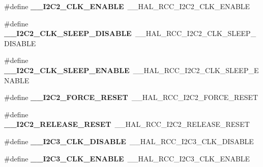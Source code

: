 \begin{DoxyCompactItemize}
\mbox{\label{group___h_a_l___r_c_c___aliased_ga5cef079b7e35da960f9871a7d1ed1816}} 
\#define {\bfseries \+\_\+\+\_\+\+I2\+C2\+\_\+\+C\+L\+K\+\_\+\+E\+N\+A\+B\+LE}~\+\_\+\+\_\+\+H\+A\+L\+\_\+\+R\+C\+C\+\_\+\+I2\+C2\+\_\+\+C\+L\+K\+\_\+\+E\+N\+A\+B\+LE
\item 
\mbox{\label{group___h_a_l___r_c_c___aliased_ga9433bf9082b7128475bf4a4073bcdca1}} 
\#define {\bfseries \+\_\+\+\_\+\+I2\+C2\+\_\+\+C\+L\+K\+\_\+\+S\+L\+E\+E\+P\+\_\+\+D\+I\+S\+A\+B\+LE}~\+\_\+\+\_\+\+H\+A\+L\+\_\+\+R\+C\+C\+\_\+\+I2\+C2\+\_\+\+C\+L\+K\+\_\+\+S\+L\+E\+E\+P\+\_\+\+D\+I\+S\+A\+B\+LE
\item 
\mbox{\label{group___h_a_l___r_c_c___aliased_ga64ad1beac30d497e381d374778b1a953}} 
\#define {\bfseries \+\_\+\+\_\+\+I2\+C2\+\_\+\+C\+L\+K\+\_\+\+S\+L\+E\+E\+P\+\_\+\+E\+N\+A\+B\+LE}~\+\_\+\+\_\+\+H\+A\+L\+\_\+\+R\+C\+C\+\_\+\+I2\+C2\+\_\+\+C\+L\+K\+\_\+\+S\+L\+E\+E\+P\+\_\+\+E\+N\+A\+B\+LE
\item 
\mbox{\label{group___h_a_l___r_c_c___aliased_ga07143f105327507321078f673940461d}} 
\#define {\bfseries \+\_\+\+\_\+\+I2\+C2\+\_\+\+F\+O\+R\+C\+E\+\_\+\+R\+E\+S\+ET}~\+\_\+\+\_\+\+H\+A\+L\+\_\+\+R\+C\+C\+\_\+\+I2\+C2\+\_\+\+F\+O\+R\+C\+E\+\_\+\+R\+E\+S\+ET
\item 
\mbox{\label{group___h_a_l___r_c_c___aliased_gaf7a482f23ba23252ef88c00e86edde9a}} 
\#define {\bfseries \+\_\+\+\_\+\+I2\+C2\+\_\+\+R\+E\+L\+E\+A\+S\+E\+\_\+\+R\+E\+S\+ET}~\+\_\+\+\_\+\+H\+A\+L\+\_\+\+R\+C\+C\+\_\+\+I2\+C2\+\_\+\+R\+E\+L\+E\+A\+S\+E\+\_\+\+R\+E\+S\+ET
\item 
\mbox{\label{group___h_a_l___r_c_c___aliased_ga7da00da30c1b02d1c1299dd878214db2}} 
\#define {\bfseries \+\_\+\+\_\+\+I2\+C3\+\_\+\+C\+L\+K\+\_\+\+D\+I\+S\+A\+B\+LE}~\+\_\+\+\_\+\+H\+A\+L\+\_\+\+R\+C\+C\+\_\+\+I2\+C3\+\_\+\+C\+L\+K\+\_\+\+D\+I\+S\+A\+B\+LE
\item 
\mbox{\label{group___h_a_l___r_c_c___aliased_gaf7f71023839a5cad83bada95ff73741f}} 
\#define {\bfseries \+\_\+\+\_\+\+I2\+C3\+\_\+\+C\+L\+K\+\_\+\+E\+N\+A\+B\+LE}~\+\_\+\+\_\+\+H\+A\+L\+\_\+\+R\+C\+C\+\_\+\+I2\+C3\+\_\+\+C\+L\+K\+\_\+\+E\+N\+A\+B\+LE

\end{DoxyCompactItemize}
